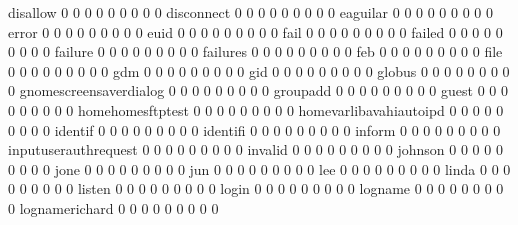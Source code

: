 \documentclass[compress,8pt]{beamer}
\begin{document}
\begin{frame}
\begin{Schunk}
  disallow                                   0   0   0   0   0   0   0   0   0
  disconnect                                 0   0   0   0   0   0   0   0   0
  eaguilar                                   0   0   0   0   0   0   0   0   0
  error                                      0   0   0   0   0   0   0   0   0
  euid                                       0   0   0   0   0   0   0   0   0
  fail                                       0   0   0   0   0   0   0   0   0
  failed                                     0   0   0   0   0   0   0   0   0
  failure                                    0   0   0   0   0   0   0   0   0
  failures                                   0   0   0   0   0   0   0   0   0
  feb                                        0   0   0   0   0   0   0   0   0
  file                                       0   0   0   0   0   0   0   0   0
  gdm                                        0   0   0   0   0   0   0   0   0
  gid                                        0   0   0   0   0   0   0   0   0
  globus                                     0   0   0   0   0   0   0   0   0
  gnomescreensaverdialog                     0   0   0   0   0   0   0   0   0
  groupadd                                   0   0   0   0   0   0   0   0   0
  guest                                      0   0   0   0   0   0   0   0   0
  homehomesftptest                           0   0   0   0   0   0   0   0   0
  homevarlibavahiautoipd                     0   0   0   0   0   0   0   0   0
  identif                                    0   0   0   0   0   0   0   0   0
  identifi                                   0   0   0   0   0   0   0   0   0
  inform                                     0   0   0   0   0   0   0   0   0
  inputuserauthrequest                       0   0   0   0   0   0   0   0   0
  invalid                                    0   0   0   0   0   0   0   0   0
  johnson                                    0   0   0   0   0   0   0   0   0
  jone                                       0   0   0   0   0   0   0   0   0
  jun                                        0   0   0   0   0   0   0   0   0
  lee                                        0   0   0   0   0   0   0   0   0
  linda                                      0   0   0   0   0   0   0   0   0
  listen                                     0   0   0   0   0   0   0   0   0
  login                                      0   0   0   0   0   0   0   0   0
  logname                                    0   0   0   0   0   0   0   0   0
  lognamerichard                             0   0   0   0   0   0   0   0   0

\end{Schunk}
\end{frame}
\end{document}
